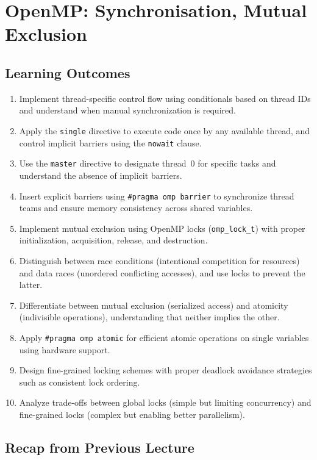 \chapter{OpenMP: Synchronisation, Mutual Exclusion}
\label{ch:synchronization}

\section*{Learning Outcomes}

\begin{enumerate}
    \item Implement thread-specific control flow using conditionals based on thread IDs and understand when manual synchronization is required.
    \item Apply the \texttt{single} directive to execute code once by any available thread, and control implicit barriers using the \texttt{nowait} clause.
    \item Use the \texttt{master} directive to designate thread~0 for specific tasks and understand the absence of implicit barriers.
    \item Insert explicit barriers using \texttt{\#pragma omp barrier} to synchronize thread teams and ensure memory consistency across shared variables.
    \item Implement mutual exclusion using OpenMP locks (\texttt{omp\_lock\_t}) with proper initialization, acquisition, release, and destruction.
    \item Distinguish between race conditions (intentional competition for resources) and data races (unordered conflicting accesses), and use locks to prevent the latter.
    \item Differentiate between mutual exclusion (serialized access) and atomicity (indivisible operations), understanding that neither implies the other.
    \item Apply \texttt{\#pragma omp atomic} for efficient atomic operations on single variables using hardware support.
    \item Design fine-grained locking schemes with proper deadlock avoidance strategies such as consistent lock ordering.
    \item Analyze trade-offs between global locks (simple but limiting concurrency) and fine-grained locks (complex but enabling better parallelism).
\end{enumerate}

\section*{Recap from Previous Lecture}

